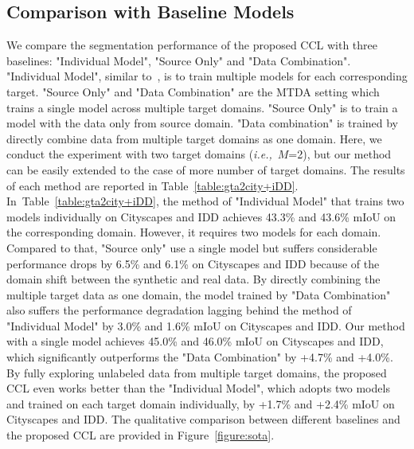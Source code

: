 \subsection{Comparison with Baseline Models}
We compare the segmentation performance of the proposed CCL with three baselines: "Individual Model", "Source Only" and "Data Combination". "Individual Model", similar to~\cite{vu2019advent}, is to train multiple models for each corresponding target. "Source Only" and "Data Combination" are the MTDA setting which trains a single model across multiple target domains. "Source Only" is to train a model with the data only from source domain. "Data combination" is trained by directly combine data from multiple target domains as one domain. Here, we conduct the experiment with two target domains (\textit{i.e.,}~$M$=2), but our method can be easily extended to the case of more number of target domains. The results of each method are reported in Table~\ref{table:gta2city+iDD}. In~Table~\ref{table:gta2city+iDD}, the method of "Individual Model" that trains two models individually on Cityscapes and IDD achieves 43.3\% and 43.6\% mIoU on the corresponding domain. However, it requires two models for each domain. Compared to that, "Source only" use a single model but suffers considerable performance drops by 6.5\% and 6.1\% on Cityscapes and IDD because of the domain shift between the synthetic and real data. By directly combining the multiple target data as one domain, the model trained by "Data Combination" also suffers the performance degradation lagging behind the method of "Individual Model" by 3.0\% and 1.6\% mIoU on Cityscapes and IDD. Our method with a single model achieves 45.0\% and 46.0\% mIoU on Cityscapes and IDD, which significantly outperforms the "Data Combination" by +4.7\% and +4.0\%. By fully exploring unlabeled data from multiple target domains, the proposed CCL even works better than the "Individual Model", which adopts two models and trained on each target domain individually, by +1.7\% and +2.4\% mIoU on Cityscapes and IDD. The qualitative comparison between different baselines and the proposed CCL are provided in Figure~\ref{figure:sota}.


